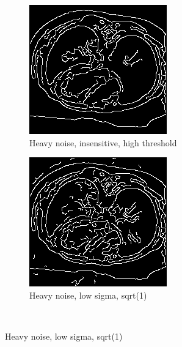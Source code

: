 \begin{figure}[H]
  \begin{subfigure}{.5\textwidth}
    \centering
    \includegraphics[width=.9\textwidth]{./edgedetection/heavy_noise/h_noise_insens_h_thres}
    \caption{Heavy noise, insensitive, high threshold}
    \label{fig:h_noise_insens_h_thres}
  \end{subfigure}%
  
    \begin{subfigure}{.5\textwidth}
    \centering
    \includegraphics[width=.9\textwidth]{./edgedetection/heavy_noise/h_noise_insens_l_thres}
    \caption{Heavy noise, low sigma, sqrt(1)}
    \label{fig:h_noise_insens_l_thres}
  \end{subfigure}\\%
  

\end{figure}
